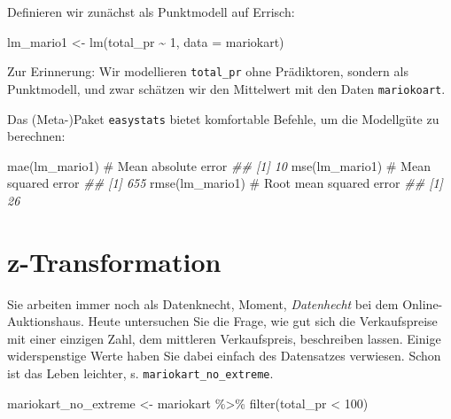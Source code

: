 \documentclass[
  letterpaper,
]{scrbook}
\newenvironment{Shaded}{\begin{snugshade}}{\end{snugshade}}
\newcommand{\AttributeTok}[1]{\textcolor[rgb]{0.40,0.45,0.13}{#1}}
\newcommand{\CommentTok}[1]{\textcolor[rgb]{0.37,0.37,0.37}{#1}}
\newcommand{\DecValTok}[1]{\textcolor[rgb]{0.68,0.00,0.00}{#1}}
\newcommand{\DocumentationTok}[1]{\textcolor[rgb]{0.37,0.37,0.37}{\textit{#1}}}
\newcommand{\FunctionTok}[1]{\textcolor[rgb]{0.28,0.35,0.67}{#1}}
\newcommand{\NormalTok}[1]{\textcolor[rgb]{0.00,0.23,0.31}{#1}}
\newcommand{\OtherTok}[1]{\textcolor[rgb]{0.00,0.23,0.31}{#1}}
\newcommand{\SpecialCharTok}[1]{\textcolor[rgb]{0.37,0.37,0.37}{#1}}
\theoremstyle{definition}
\theoremstyle{definition}
\theoremstyle{definition}
\theoremstyle{remark}
\begin{document}
Definieren wir zunächst als Punktmodell auf Errisch:

\begin{Shaded}
\begin{Highlighting}[]
\NormalTok{lm\_mario1 }\OtherTok{\textless{}{-}} \FunctionTok{lm}\NormalTok{(total\_pr }\SpecialCharTok{\textasciitilde{}} \DecValTok{1}\NormalTok{, }\AttributeTok{data =}\NormalTok{ mariokart)}
\end{Highlighting}
\end{Shaded}

Zur Erinnerung: Wir modellieren \texttt{total\_pr} ohne Prädiktoren,
sondern als Punktmodell, und zwar schätzen wir den Mittelwert mit den
Daten \texttt{mariokoart}.

Das (Meta-)Paket \texttt{easystats} bietet komfortable Befehle, um die
Modellgüte zu berechnen:

\begin{Shaded}
\begin{Highlighting}[]
\FunctionTok{mae}\NormalTok{(lm\_mario1)  }\CommentTok{\# Mean absolute error}
\DocumentationTok{\#\# [1] 10}
\FunctionTok{mse}\NormalTok{(lm\_mario1)  }\CommentTok{\# Mean squared error}
\DocumentationTok{\#\# [1] 655}
\FunctionTok{rmse}\NormalTok{(lm\_mario1)  }\CommentTok{\# Root mean squared error}
\DocumentationTok{\#\# [1] 26}
\end{Highlighting}
\end{Shaded}

\section{z-Transformation}\label{z-transformation}

Sie arbeiten immer noch als Datenknecht, Moment, \emph{Datenhecht} bei
dem Online-Auktionshaus. Heute untersuchen Sie die Frage, wie gut sich
die Verkaufspreise mit einer einzigen Zahl, dem mittleren Verkaufspreis,
beschreiben lassen. Einige widerspenstige Werte haben Sie dabei einfach
des Datensatzes verwiesen. Schon ist das Leben leichter, s.
\texttt{mariokart\_no\_extreme}.

\begin{Shaded}
\begin{Highlighting}[]
\NormalTok{mariokart\_no\_extreme }\OtherTok{\textless{}{-}} 
\NormalTok{  mariokart }\SpecialCharTok{\%\textgreater{}\%} 
  \FunctionTok{filter}\NormalTok{(total\_pr }\SpecialCharTok{\textless{}} \DecValTok{100}\NormalTok{)}
\end{Highlighting}
\end{Shaded}
\end{document}
